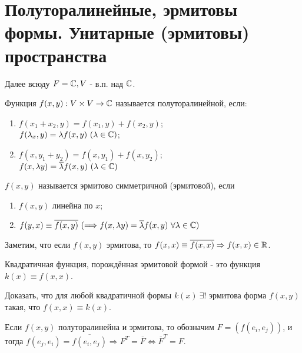 \section{Полуторалинейные, эрмитовы формы. Унитарные (эрмитовы) пространства}
Далее всюду $F = \mathbb{C}, V$ - в.п. над $\mathbb{C}$.
\begin{definition}
    Функция $f(x, y): V\times V \rightarrow \mathbb{C}$ называется полуторалинейной, если:
    \begin{enumerate}
        \item $f(x_1 + x_2, y) = f(x_1, y) + f(x_2, y)$;\\
              $f(\lambda_x, y) = \lambda f(x, y) \ (\lambda \in \mathbb{C})$;
        \item $f(x, y_1 + y_2) = f(x, y_1) + f(x, y_2)$;\\
              $f(x, \lambda y) = \overline{\lambda} f(x, y) \ (\lambda \in \mathbb{C})$
    \end{enumerate}
\end{definition}
\begin{definition}
    $f(x,y)$ называется эрмитово симметричной (эрмитовой), если 
    \begin{enumerate}
        \item $f(x, y)$ линейна по $x$;
        \item $f(y, x) \equiv \overline{f(x,y)} \ (\Longrightarrow f(x, \lambda y) = \overline{\lambda}f(x,y) \ \forall \lambda \in \CC)$
    \end{enumerate}
\end{definition}
Заметим, что если $f(x,y)$ эрмитова, то $f(x, x) \equiv \overline{f(x,x)} \Rightarrow f(x,x) \in \mathbb{R}$.
\begin{definition}
    Квадратичная функция, порождённая эрмитовой формой - это функция $k(x) \equiv f(x,x)$.
\end{definition}
\begin{exercise}
    Доказать, что для любой квадратичной формы $k(x) \ \exists!$ эрмитова форма $f(x, y)$ такая, что $f(x,x) \equiv k(x)$. 
\end{exercise}
Если $f(x,y)$ полуторалинейна и эрмитова, то обозначим $F = (f(e_i, e_j))$, и тогда $f(e_j, e_i) = \overline{f(e_i, e_j)} \Longrightarrow F^T = \overline{F} \Longleftrightarrow \overline{F}^T = F$.
